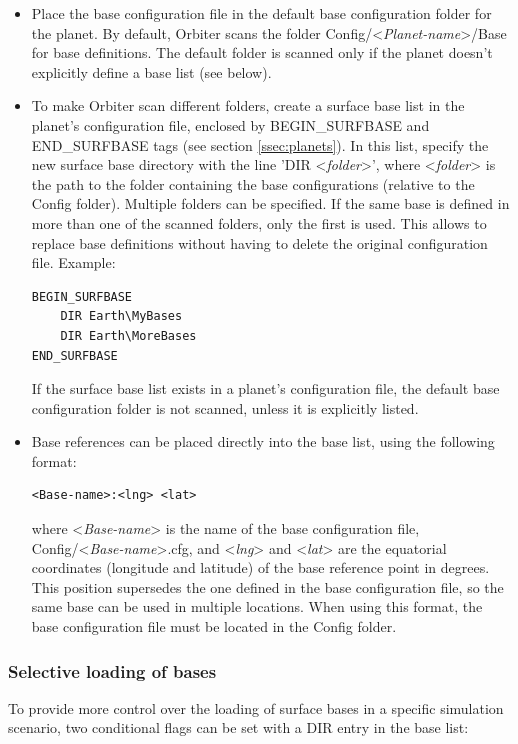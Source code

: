 \documentclass[Orbiter Developer Manual.tex]{subfiles}
\begin{document}
\begin{itemize}
\item Place the base configuration file in the default base configuration folder for the planet. By default, Orbiter scans the folder Config/<\textit{Planet-name}>/Base for base definitions. The default folder is scanned only if the planet doesn't explicitly define a base list (see below).
\item To make Orbiter scan different folders, create a surface base list in the planet's configuration file, enclosed by BEGIN\_SURFBASE and END\_SURFBASE tags (see section \ref{ssec:planets}). In this list, specify the new surface base directory with the line 'DIR <\textit{folder}>', where <\textit{folder}> is the path to the folder containing the base configurations (relative to the Config folder). Multiple folders can be specified. If the same base is defined in more than one of the scanned folders, only the first is used. This allows to replace base definitions without having to delete the original configuration file. Example:

\begin{lstlisting}[language=OSFS]
BEGIN_SURFBASE
	DIR Earth\MyBases
	DIR Earth\MoreBases
END_SURFBASE
\end{lstlisting}

\noindent
If the surface base list exists in a planet's configuration file, the default base configuration folder is not scanned, unless it is explicitly listed.
\item Base references can be placed directly into the base list, using the following format:\\

\begin{lstlisting}[language=OSFS]
<Base-name>:<lng> <lat>
\end{lstlisting}

\noindent
where <\textit{Base-name}> is the name of the base configuration file, Config/<\textit{Base-name}>.cfg, and <\textit{lng}> and <\textit{lat}> are the equatorial coordinates (longitude and latitude) of the base reference point in degrees. This position supersedes the one defined in the base configuration file, so the same base can be used in multiple locations. When using this format, the base configuration file must be located in the Config folder.
\end{itemize}


\subsubsection*{Selective loading of bases}
To provide more control over the loading of surface bases in a specific simulation scenario, two conditional flags can be set with a DIR entry in the base list:
\end{document}
